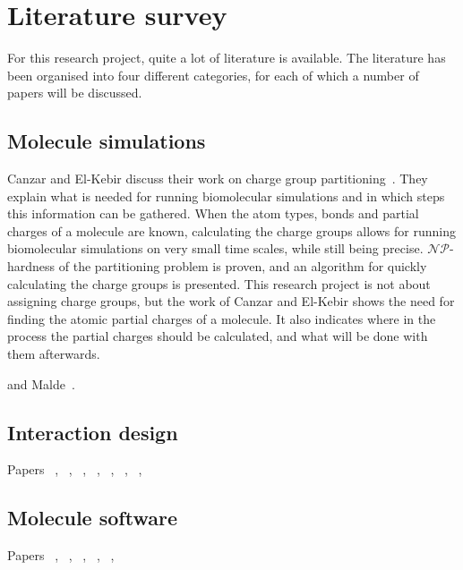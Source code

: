 \chapter{Literature survey}

For this research project, quite a lot of literature is available. The literature has been organised into four different categories, for each of which a number of papers will be discussed.


\section{Molecule simulations}

Canzar and El-Kebir discuss their work on charge group partitioning~\cite{canzar2012charge}. They explain what is needed for running biomolecular simulations and in which steps this information can be gathered. When the atom types, bonds and partial charges of a molecule are known, calculating the charge groups allows for running biomolecular simulations on very small time scales, while still being precise. $\mathcal{NP}$-hardness of the partitioning problem is proven, and an algorithm for quickly calculating the charge groups is presented. This research project is not about assigning charge groups, but the work of Canzar and El-Kebir shows the need for finding the atomic partial charges of a molecule. It also indicates where in the process the partial charges should be calculated, and what will be done with them afterwards.

and Malde~\cite{malde2011automated}.


\section{Interaction design}

Papers ~\cite{norman2002design}, ~\cite{norman1990interfaces}, ~\cite{norman2002emotion}, ~\cite{norman2005human}, ~\cite{norman2010gestural}, ~\cite{thimbleby2007press}, ~\cite{blair2008user}, ~\cite{badre2002shaping}


\section{Molecule software}

Papers ~\cite{ertl2010molecular}, ~\cite{hanson2013jsmol}, ~\cite{bienfait2013jsme}, ~\cite{ekins2013tb}, ~\cite{fjeld2007tangible}, ~\cite{ertl2012molecule}


